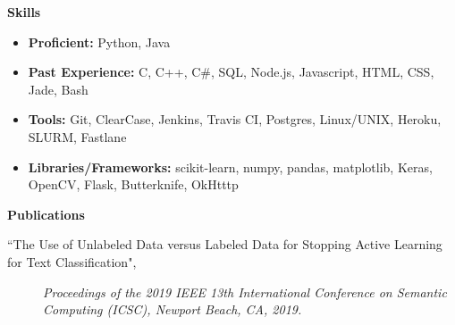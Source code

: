\documentclass[letterpaper,10pt]{article}
\newcommand{\resitem}[1]{\item #1 \vspace{-2pt}}
\newcommand{\resheading}[1]{{\large \colorbox{mygrey}{\begin{minipage}{\textwidth}{\textbf{#1 \vphantom{p\^{E}}}}\end{minipage}}}}
\begin{document}
\resheading{Skills}
	\begin{itemize}
	\resitem{\textbf{Proficient:} Python, Java}
	\resitem{\textbf{Past Experience:} C, C++, C\#, SQL, Node.js, Javascript, HTML, CSS, Jade, Bash}
	\resitem{\textbf{Tools:} Git, ClearCase, Jenkins, Travis CI, Postgres, Linux/UNIX, Heroku, SLURM, Fastlane}
	\resitem{\textbf{Libraries/Frameworks:} scikit-learn, numpy, pandas, matplotlib, Keras, OpenCV, Flask, Butterknife, OkHtttp}
	\end{itemize}

\resheading{Publications}
\begin{description}
\item[``The Use of Unlabeled Data versus Labeled Data for Stopping Active Learning for Text Classification",]
\emph{Proceedings of the 2019 IEEE 13th International Conference on Semantic Computing (ICSC), Newport Beach, CA, 2019.}
\end{description}
\end{document}
